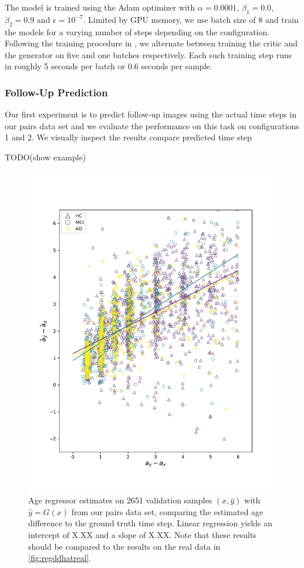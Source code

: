 The model is trained using the Adam optimizer with $\alpha = 0.0001$, $\beta_1 = 0.0$, $\beta_2 = 0.9$ and $\epsilon = 10^{-7}$. Limited by GPU memory, we use batch size of 8 and train the models for a varying number of steps depending on the configuration. Following the training procedure in \cite{goodfellow2014generative}, we alternate between training the critic and the generator on five and one batches respectively. Each such training step runs in roughly 5 seconds per batch or 0.6 seconds per sample.

\subsubsection*{Follow-Up Prediction}
Our first experiment is to predict follow-up images using the actual time steps in our pairs data set and we evaluate the performance on this task on configurations 1 and 2.
We visually inspect the results
compare predicted time step

TODO(show example)

\begin{figure}[p]
	\centering
	\includegraphics[width=.7\linewidth]{images/age_plots/d_dhat_fake}
	\vspace*{-15pt}
	\caption{Age regressor estimates on 2651 validation samples $(x, \hat y)$ with $ \hat y = G(x) $ from our pairs data set, comparing the estimated age difference to the ground truth time step. Linear regression yields an intercept of X.XX and a slope of X.XX. Note that these results should be compared to the results on the real data in \autoref{fig:regddhatreal}.}
	\label{fig:regddhatfake}
\end{figure}


